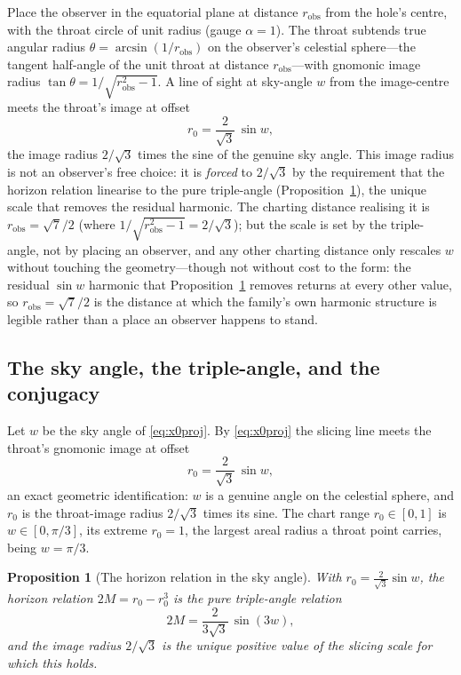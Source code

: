 \documentclass[11pt,a4paper]{article}
\newtheorem{proposition}[theorem]{Proposition}
\theoremstyle{definition}
\begin{document}
Place the observer in the equatorial plane at distance $r_{\mathrm{obs}}$ from the hole's centre, with the throat circle of unit radius (gauge $\alpha=1$). The throat subtends true angular radius $\theta=\arcsin(1/r_{\mathrm{obs}})$ on the observer's celestial sphere---the tangent half-angle of the unit throat at distance $r_{\mathrm{obs}}$---with gnomonic image radius $\tan\theta=1/\sqrt{r_{\mathrm{obs}}^{2}-1}$. A line of sight at sky-angle $w$ from the image-centre meets the throat's image at offset
\begin{equation}\label{eq:x0proj}
  r_{0}=\frac{2}{\sqrt3}\,\sin w ,
\end{equation}
the image radius $2/\sqrt3$ times the sine of the genuine sky angle. This image radius is not an observer's free choice: it is \emph{forced} to $2/\sqrt3$ by the requirement that the horizon relation linearise to the pure triple-angle (Proposition~\ref{prop:triple}), the unique scale that removes the residual harmonic. The charting distance realising it is $r_{\mathrm{obs}}=\sqrt7/2$ (where $1/\sqrt{r_{\mathrm{obs}}^{2}-1}=2/\sqrt3$); but the scale is set by the triple-angle, not by placing an observer, and any other charting distance only rescales $w$ without touching the geometry---though not without cost to the form: the residual $\sin w$ harmonic that Proposition~\ref{prop:triple} removes returns at every other value, so $r_{\mathrm{obs}}=\sqrt7/2$ is the distance at which the family's own harmonic structure is legible rather than a place an observer happens to stand.

\subsection{The sky angle, the triple-angle, and the conjugacy}\label{sec:throat-angle}

Let $w$ be the sky angle of \eqref{eq:x0proj}. By \eqref{eq:x0proj} the slicing line meets the throat's gnomonic image at offset
\begin{equation}\label{eq:x0sinw}
  r_{0}=\frac{2}{\sqrt3}\,\sin w ,
\end{equation}
an exact geometric identification: $w$ is a genuine angle on the celestial sphere, and $r_{0}$ is the throat-image radius $2/\sqrt3$ times its sine. The chart range $r_{0}\in[0,1]$ is $w\in[0,\pi/3]$, its extreme $r_{0}=1$, the largest areal radius a throat point carries, being $w=\pi/3$.

\begin{proposition}[The horizon relation in the sky angle]\label{prop:triple}
With $r_{0}=\tfrac{2}{\sqrt3}\sin w$, the horizon relation $2M=r_{0}-r_{0}^{3}$ is the pure triple-angle relation
\begin{equation}\label{eq:tripleM}
  2M=\frac{2}{3\sqrt3}\,\sin(3w),
\end{equation}
and the image radius $2/\sqrt3$ is the unique positive value of the slicing scale for which this holds.
\end{proposition}
\end{document}

